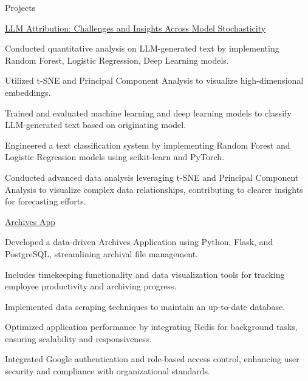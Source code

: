 \documentclass{resume} %
\begin{document}
    \begin{rSection}{Projects}
                    \begin{rSubsection}
                                    {\href{https://github.com/aa{-}dank/x{-}domain{-}llm{-}classification}{LLM Attribution: Challenges and Insights Across Model Stochasticity}}
                                {\normalfont{ - }}{}{}
                                    \item Conducted quantitative analysis on LLM{-}generated text by implementing Random Forest, Logistic Regression, Deep Learning models.
                                    \item Utilized t{-}SNE and Principal Component Analysis to visualize high{-}dimensional embeddings.
                                    \item Trained and evaluated machine learning and deep learning models to classify LLM{-}generated text based on originating model.
                                    \item Engineered a text classification system by implementing Random Forest and Logistic Regression models using scikit{-}learn and PyTorch.
                                    \item Conducted advanced data analysis leveraging t{-}SNE and Principal Component Analysis to visualize complex data relationships, contributing to clearer insights for forecasting efforts.
                            \end{rSubsection}
                    \begin{rSubsection}
                                    {\href{https://github.com/aa{-}dank/archives\_app}{Archives App}}
                                {\normalfont{ - }}{}{}
                                    \item Developed a data{-}driven Archives Application using Python, Flask, and PostgreSQL, streamlining archival file management.
                                    \item Includes timekeeping functionality and data visualization tools for tracking employee productivity and archiving progress.
                                    \item Implemented data scraping techniques to maintain an up{-}to{-}date database.
                                    \item Optimized application performance by integrating Redis for background tasks, ensuring scalability and responsiveness.
                                    \item Integrated Google authentication and role{-}based access control, enhancing user security and compliance with organizational standards.

\end{rSubsection}
\end{rSection}
\end{document}
